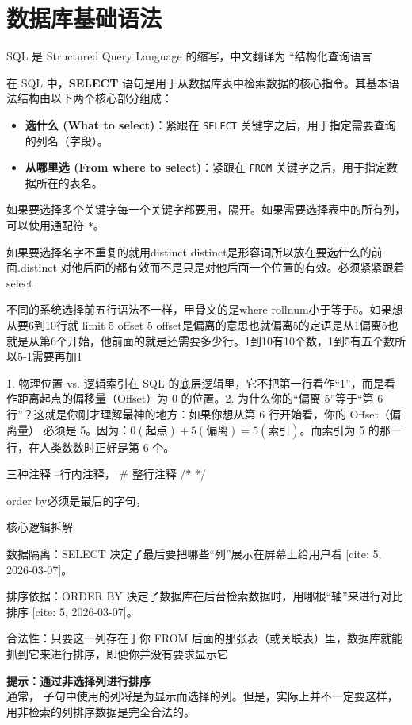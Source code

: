 \chapter{数据库基础语法}
SQL 是 Structured Query Language 的缩写，中文翻译为 “结构化查询语言
\begin{definition}[SELECT 语句]
在 SQL 中，\textbf{SELECT} 语句是用于从数据库表中检索数据的核心指令。其基本语法结构由以下两个核心部分组成：
\begin{itemize}
\item \textbf{选什么 (What to select)}：紧跟在 \texttt{SELECT} 关键字之后，用于指定需要查询的列名（字段）。
\item \textbf{从哪里选 (From where to select)}：紧跟在 \texttt{FROM} 关键字之后，用于指定数据所在的表名。
\end{itemize}
\end{definition}
\begin{dxtips}
    如果要选择多个关键字每一个关键字都要用，隔开。如果需要选择表中的所有列，可以使用通配符 \texttt{*}。
    
\end{dxtips}
\begin{dxtips}
   如果要选择名字不重复的就用distinct distinct是形容词所以放在要选什么的前面.distinct 对他后面的都有效而不是只是对他后面一个位置的有效。必须紧紧跟着select 
\end{dxtips}
\begin{dxtips}
    不同的系统选择前五行语法不一样，甲骨文的是where rollnum小于等于5。如果想从要6到10行就 limit 5 offset 5 offset是偏离的意思也就偏离5的定语是从1偏离5也就是从第6个开始，他前面的就是还需要多少行。1到10有10个数，1到5有五个数所以5-1需要再加1
\end{dxtips}
\begin{note}
    1. 物理位置 vs. 逻辑索引在 SQL 的底层逻辑里，它不把第一行看作“1”，而是看作距离起点的偏移量（Offset）为 0 的位置。2. 为什么你的“偏离 5”等于“第 6 行”？这就是你刚才理解最神的地方：如果你想从第 6 行开始看，你的 Offset（偏离量） 必须是 5。因为：$0 (\text{起点}) + 5 (\text{偏离}) = 5 (\text{索引})$。而索引为 5 的那一行，在人类数数时正好是第 6 个。
\end{note}
\begin{dxtips}
    三种注释 --行内注释，
    # 整行注释 
    /* */
\end{dxtips}
\begin{definition}[排序]
    order by必须是最后的字句，

核心逻辑拆解

数据隔离：SELECT 决定了最后要把哪些“列”展示在屏幕上给用户看 [cite: 5, 2026-03-07]。

排序依据：ORDER BY 决定了数据库在后台检索数据时，用哪根“轴”来进行对比排序 [cite: 5, 2026-03-07]。

合法性：只要这一列存在于你 FROM 后面的那张表（或关联表）里，数据库就能抓到它来进行排序，即便你并没有要求显示它
\end{definition}
\begin{note}
    \textbf{提示：通过非选择列进行排序} \\
    通常， 子句中使用的列将是为显示而选择的列。但是，实际上并不一定要这样，用非检索的列排序数据是完全合法的。
\end{note}

